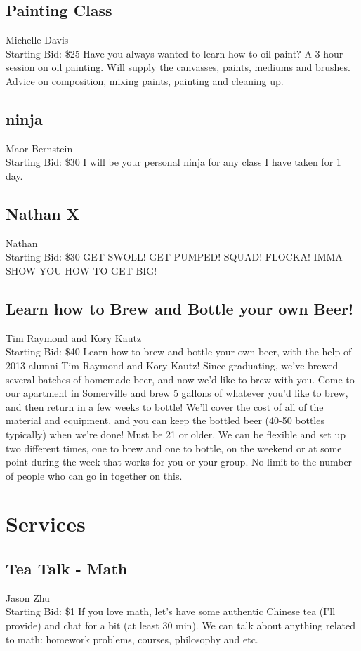 \documentclass[11pt]{article}
\begin{document}
\subsection{Painting Class}
Michelle Davis
\\
Starting Bid: \$25
\newline
Have you always wanted to learn how to oil paint? A 3-hour session on oil painting. Will supply the canvasses, paints, mediums and brushes. Advice on composition, mixing paints, painting and cleaning up.
\subsection{ninja}
Maor Bernstein
\\
Starting Bid: \$30
\newline
I will be your personal ninja for any class I have taken for 1 day.
\subsection{Nathan X}
Nathan
\\
Starting Bid: \$30
\newline
GET SWOLL! GET PUMPED! SQUAD! FLOCKA! IMMA SHOW YOU HOW TO GET BIG!
\subsection{Learn how to Brew and Bottle your own Beer!}
Tim Raymond and Kory Kautz
\\
Starting Bid: \$40
\newline
Learn how to brew and bottle your own beer, with the help of 2013 alumni Tim Raymond and Kory Kautz!  Since graduating, we've brewed several batches of homemade beer, and now we'd like to brew with you.  Come to our apartment in Somerville and brew 5 gallons of whatever you'd like to brew, and then return in a few weeks to bottle!  We'll cover the cost of all of the material and equipment, and you can keep the bottled beer (40-50 bottles typically) when we're done!  Must be 21 or older.  We can be flexible and set up two different times, one to brew and one to bottle, on the weekend or at some point during the week that works for you or your group.  No limit to the number of people who can go in together on this.
\section{Services}
\subsection{Tea Talk - Math}
Jason Zhu
\\
Starting Bid: \$1
\newline
If you love math, let's have some authentic Chinese tea (I'll provide) and chat for a bit (at least 30 min). We can talk about anything related to math: homework problems, courses, philosophy and etc.
\end{document}
